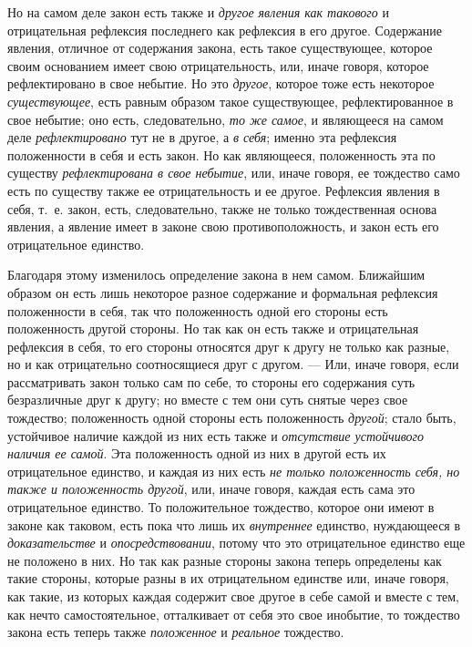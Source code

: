 Но на самом деле закон есть также и {\em другое явления
как такового} и отрицательная рефлексия последнего как рефлексия в его
другое. Содержание явления, отличное от содержания закона, есть такое
существующее, которое своим основанием имеет свою отрицательность, или,
иначе говоря, которое рефлектировано в свое небытие. Но это
{\em другое}, которое тоже есть некоторое
{\em существующее}, есть равным образом такое
существующее, рефлектированное в свое небытие; оно есть, следовательно,
{\em то же самое}, и являющееся на самом деле
{\em рефлектировано} тут не в другое, а
{\em в себя}; именно эта рефлексия положенности в себя
и есть закон. Но как являющееся, положенность эта по существу
{\em рефлектирована в свое небытие}, или, иначе говоря,
ее тождество само есть по существу также ее отрицательность и ее другое.
Рефлексия явления в себя, т.~е. закон, есть, следовательно, также не только
тождественная основа явления, а явление имеет в законе свою
противоположность, и закон есть его отрицательное единство.

Благодаря этому изменилось определение закона в нем самом. Ближайшим образом
он есть лишь некоторое разное содержание и формальная рефлексия
положенности в себя, так что положенность одной его стороны есть
положенность другой стороны. Но так как он есть также и отрицательная
рефлексия в себя, то его стороны относятся друг к другу не только как
разные, но и как отрицательно соотносящиеся друг с другом. — Или, иначе
говоря, если рассматривать закон только сам по себе, то стороны его
содержания суть безразличные друг к другу; но вместе с тем они суть снятые
через свое тождество; положенность одной стороны есть положенность
{\em другой}; стало быть, устойчивое наличие каждой из
них есть также и {\em отсутствие устойчивого наличия ее
самой}. Эта положенность одной из них в другой есть их отрицательное
единство, и каждая из них есть {\em не только
положенность себя, но также и положенность другой}, или, иначе говоря,
каждая есть сама это отрицательное единство. То положительное тождество,
которое они имеют в законе как таковом, есть пока что лишь их
{\em внутреннее} единство, нуждающееся в
{\em доказательстве} и
{\em опосредствовании}, потому что это отрицательное
единство еще не положено в них. Но так как разные стороны закона теперь
определены как такие стороны, которые разны в их отрицательном единстве
или, иначе говоря, как такие, из которых каждая содержит свое другое в себе
самой и вместе с тем, как нечто самостоятельное, отталкивает от себя это
свое инобытие, то тождество закона есть теперь также
{\em положенное} и {\em реальное}
тождество.

